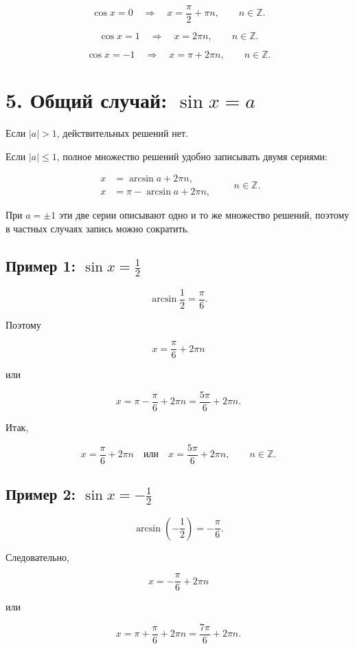 \documentclass[a4paper,12pt]{article}
\newcommand{\Z}{\mathbb{Z}}
\begin{document}
\[
\boxed{\cos x=0\quad\Longrightarrow\quad x=\frac{\pi}{2}+\pi n,
\qquad n\in\Z.}
\]

\[
\boxed{\cos x=1\quad\Longrightarrow\quad x=2\pi n,
\qquad n\in\Z.}
\]

\[
\boxed{\cos x=-1\quad\Longrightarrow\quad x=\pi+2\pi n,
\qquad n\in\Z.}
\]

\section{5. Общий случай: \(\sin x=a\)}

Если \(|a|>1\), действительных решений нет.

Если \(|a|\le1\), полное множество решений удобно записывать двумя сериями:

\[
\boxed{
\begin{aligned}
x&=\arcsin a+2\pi n,\\
x&=\pi-\arcsin a+2\pi n,
\end{aligned}
\qquad n\in\Z.
}
\]

При \(a=\pm1\) эти две серии описывают одно и то же множество решений, поэтому в частных случаях запись можно сократить.

\subsection{Пример 1: \(\sin x=\frac12\)}

\[
\arcsin\frac12=\frac{\pi}{6}.
\]

Поэтому

\[
x=\frac{\pi}{6}+2\pi n
\]

или

\[
x=\pi-\frac{\pi}{6}+2\pi n
=\frac{5\pi}{6}+2\pi n.
\]

Итак,

\[
\boxed{
x=\frac{\pi}{6}+2\pi n
\quad\text{или}\quad
x=\frac{5\pi}{6}+2\pi n,
\qquad n\in\Z.
}
\]

\subsection{Пример 2: \(\sin x=-\frac12\)}

\[
\arcsin\left(-\frac12\right)=-\frac{\pi}{6}.
\]

Следовательно,

\[
x=-\frac{\pi}{6}+2\pi n
\]

или

\[
x=\pi+\frac{\pi}{6}+2\pi n
=\frac{7\pi}{6}+2\pi n.
\]
\end{document}
